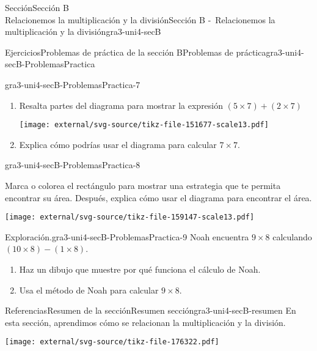 \begin{sectionptx}{Sección}{{\Large Sección B\\}Relacionemos la multiplicación y la división}{}{Sección B -~Relacionemos la multiplicación y la división}{}{}{gra3-uni4-secB}
\begin{exercises-subsection}{Ejercicios}{Problemas de práctica de la sección B}{}{Problemas de práctica}{}{}{gra3-uni4-secB-ProblemasPractica}
\begin{divisionexercise}{5}{}{}{gra3-uni4-secB-ProblemasPractica-7}
\begin{enumerate}[label={(\alph*)}]
\item{}Resalta partes del diagrama para mostrar la expresión \((5 \times 7) + (2 \times 7)\)%
\begin{image}{0}{1}{0}{}%
\texttt{[image: external/svg-source/tikz-file-151677-scale13.pdf]}
\end{image}%
\item{}Explica cómo podrías usar el diagrama para calcular \(7\times 7\).%
\end{enumerate}
\end{divisionexercise}%
\begin{divisionexercise}{6}{}{}{gra3-uni4-secB-ProblemasPractica-8}%
\vspace{-1.4\baselineskip}
\begin{sidebyside}{2}{0}{0}{0}%
\begin{sbspanel}{0.6}%
Marca o colorea el rectángulo para mostrar una estrategia que te permita encontrar su área. Después, explica cómo usar el diagrama para encontrar el área.%
\end{sbspanel}%
\begin{sbspanel}{0.4}%
\texttt{[image: external/svg-source/tikz-file-159147-scale13.pdf]}
\end{sbspanel}%
\end{sidebyside}%
\end{divisionexercise}%
\clearpage
\begin{divisionexercise}{7}{Exploración.}{}{gra3-uni4-secB-ProblemasPractica-9}%
Noah encuentra \(9 \times 8\) calculando \((10 \times 8) - (1 \times 8)\).%
%
\begin{enumerate}[label={(\alph*)}]
\item{}Haz un dibujo que muestre por qué funciona el cálculo de Noah.%
\item{}Usa el método de Noah para calcular \(9\times 8\).%
\end{enumerate}
\end{divisionexercise}%
\end{exercises-subsection}
%
%
\typeout{************************************************}
\typeout{************************************************}
%
\begin{references-subsection}{Referencias}{Resumen de la sección}{}{Resumen sección}{}{}{gra3-uni4-secB-resumen}
En esta sección, aprendimos cómo se relacionan la multiplicación y la división.%
\begin{image}{0}{1}{0}{}%
\texttt{[image: external/svg-source/tikz-file-176322.pdf]}

\end{image}
\end{references-subsection}
\end{sectionptx}
